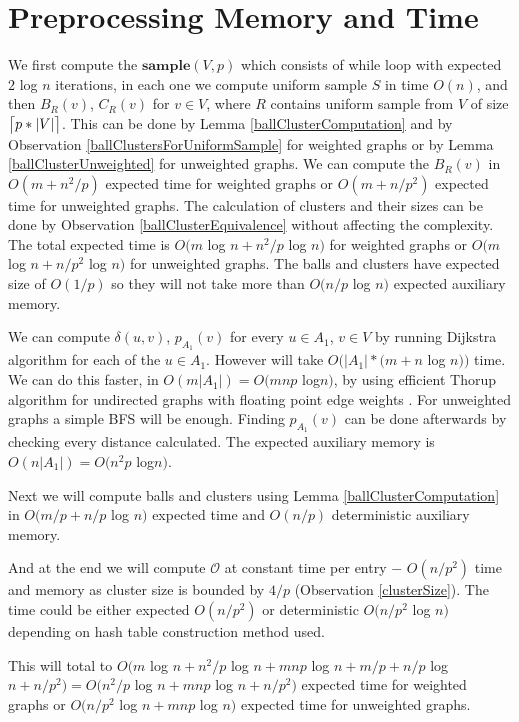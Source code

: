 \documentclass[shortabstract, lic, english]{iithesis}
\theoremstyle{definition} \newtheorem{definition}{Definition}[chapter]
\theoremstyle{remark} \newtheorem{remark}[definition]{Observation}
\theoremstyle{plain} \newtheorem{theorem}[definition]{Theorem}
\theoremstyle{plain} \newtheorem{lemma}[definition]{Lemma}
\theoremstyle{plain} \newtheorem{conjecture}[definition]{Conjecture}
\DeclarePairedDelimiter{\ceil}{\lceil}{\rceil}
\begin{document}
\section{Preprocessing Memory and Time}

We first compute the $\mathbf{sample}(V, p)$ which consists of while loop with expected $2$ log $n$ iterations,
in each one we compute uniform sample $S$ in time $O(n)$, and then $B_R(v)$, $C_R(v)$ for $v \in V$, where $R$ contains uniform sample from $V$ of size $\ceil[\big]{p * |V|}$.
This can be done by Lemma \ref{ballClusterComputation} and by Observation \ref{ballClustersForUniformSample} for weighted graphs or by Lemma \ref{ballClusterUnweighted} for unweighted graphs.
We can compute the $B_R(v)$ in $O(m + n^2/p)$ expected time for weighted graphs or $O(m + n/p^2)$ expected time for unweighted graphs.
The calculation of clusters and their sizes can be done by Observation \ref{ballClusterEquivalence} without affecting the complexity.
The total expected time is $O(m $ log $ n + n^2/p $ log $ n)$ for weighted graphs or $O(m $ log $ n + n/p^2 $ log $ n)$ for unweighted graphs.
The balls and clusters have expected size of $O(1/p)$ so they will not take more than $O(n/p $ log $ n)$ expected auxiliary memory.

We can compute $\delta(u,v)$, $p_{A_1}(v)$ for every $u \in A_1$, $v \in V$ by running Dijkstra algorithm for each of the $u \in A_1$.
However will take $O(|A_1| *(m + n$ log $ n))$ time.
We can do this faster, in $O(m|A_1|) = O(mnp$ log$ n)$, by using efficient Thorup algorithm for undirected graphs with floating point edge weights \cite{uberDijkstraInt}\cite{uberDijkstraFloat}.
For unweighted graphs a simple BFS will be enough.
Finding $p_{A_1}(v)$ can be done afterwards by checking every distance calculated.
The expected auxiliary memory is $O(n|A_1|) = O(n^2p$ log$ n)$.

Next we will compute balls and clusters using Lemma \ref{ballClusterComputation} in $O(m/p + n/p $ log $ n)$ expected time and $O(n/p)$ deterministic auxiliary memory.

And at the end we will compute $\mathcal{O}$ at constant time per entry $-$ $O(n/p^2)$ time and memory as cluster size is bounded by $4/p$ (Observation \ref{clusterSize}).
The time could be either expected $O(n/p^2)$ or deterministic $O(n/p^2 $ log $ n)$ depending on hash table construction method used.

This will total to $O(m $ log $ n + n^2/p $ log $ n + mnp$ log $ n + m/p + n/p $ log $ n + n/p^2) = O(n^2/p $ log $ n + mnp$ log $ n + n/p^2)$ expected time for weighted graphs
or $O(n/p^2 $ log $n + mnp $ log $n)$ expected time for unweighted graphs.
\end{document}

